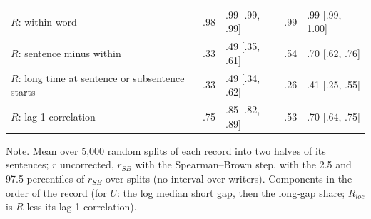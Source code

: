 \begin{table}[htbp]
\begin{tabularx}{\linewidth}{@{}lllll@{}}
$R$: within word & .98 & .99 [.99, .99] & .99 & .99 [.99, 1.00] \\
$R$: sentence minus within & .33 & .49 [.35, .61] & .54 & .70 [.62, .76] \\
$R$: long time at sentence or subsentence starts & .33 & .49 [.34, .62] & .26 & .41 [.25, .55] \\
$R$: lag-1 correlation & .75 & .85 [.82, .89] & .53 & .70 [.64, .75] \\
\bottomrule
\end{tabularx}
\par\smallskip\footnotesize Note. Mean over 5,000 random splits of each record into two halves of its sentences; $r$ uncorrected, $r_{SB}$ with the Spearman--Brown step, with the 2.5 and 97.5 percentiles of $r_{SB}$ over splits (no interval over writers). Components in the order of the record (for $U$: the log median short gap, then the long-gap share; $R_{loc}$ is $R$ less its lag-1 correlation).
\end{table}
